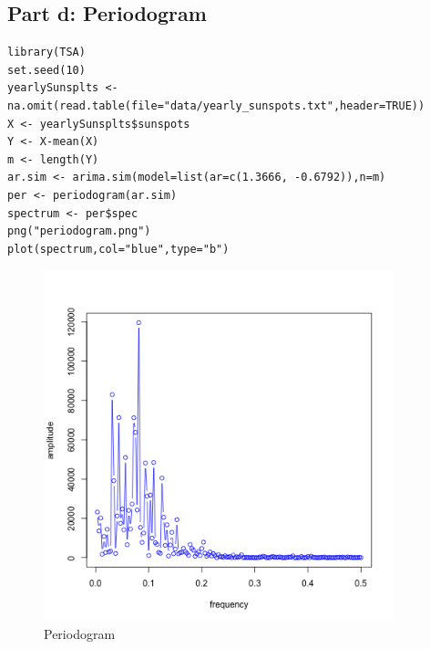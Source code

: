 \documentclass[11pt, oneside]{article}   	%
\begin{document}
 \subsection{Part d: Periodogram}
 \begin{lstlisting}
library(TSA)
set.seed(10)
yearlySunsplts <- na.omit(read.table(file="data/yearly_sunspots.txt",header=TRUE))
X <- yearlySunsplts$sunspots
Y <- X-mean(X)
m <- length(Y)
ar.sim <- arima.sim(model=list(ar=c(1.3666, -0.6792)),n=m)
per <- periodogram(ar.sim)
spectrum <- per$spec
png("periodogram.png")
plot(spectrum,col="blue",type="b")
 \end{lstlisting}
\begin{figure}[H] %
   \centering
   \includegraphics[width=4in]{periodogram.png} 
   \caption{Periodogram}
   \label{fig:per}
\end{figure}
\end{document}
